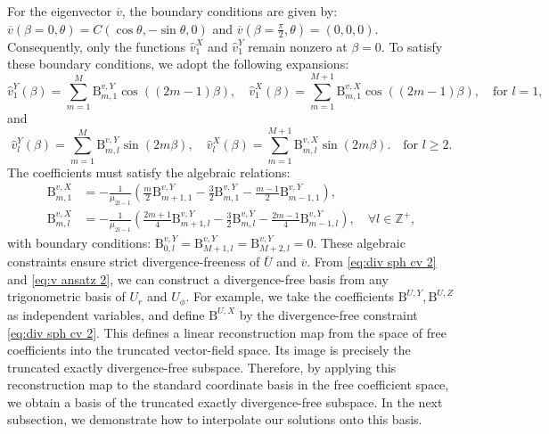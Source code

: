 \documentclass[11pt,a4paper]{article}
\numberwithin{equation}{section}
\newcommand{\Beta}{\mathrm{B}}
\begin{document}
For the eigenvector $\overline{v}$, the boundary conditions are given by: $\overline{v}
(\beta = 0, \theta) = C (\cos \theta, - \sin \theta, 0)$ and $\overline{v} \left(
\beta = \frac{\pi}{2}, \theta \right) = (0, 0, 0)$. Consequently, only the
functions $\widehat{v}_1^X$ and $\widehat{v}_1^Y$ remain nonzero at $\beta = 0$. To
satisfy these boundary conditions, we adopt the following expansions:
\begin{equation*}
  \widehat{v}_1^Y (\beta) = \sum_{m = 1}^M \Beta^{v, Y}_{m, 1} \cos ((2 m - 1)
  \beta), \quad \widehat{v}_1^X (\beta) = \sum_{m = 1}^{M + 1} \Beta^{v, X}_{m, 1}
  \cos ((2 m - 1) \beta), \quad \text{for } l = 1, \label{eq:v ansatz 2.1}
\end{equation*}
and
\begin{equation*}
  \widehat{v}_l^Y (\beta) = \sum_{m = 1}^M \Beta^{v, Y}_{m, l} \sin (2 m \beta),
  \quad \widehat{v}_l^X (\beta) = \sum_{m = 1}^{M + 1} \Beta^{v, X}_{m, l} \sin (2
  m \beta) . \quad \text{for $l \geqslant 2$.} \label{eq:v1 ansatz 2}
\end{equation*}
The coefficients must satisfy the algebraic relations:
\begin{equation}
\begin{aligned}
  \Beta^{v, X}_{m, 1} & = - \frac{1}{\mu_{2 l - 1}}  \left( \frac{m}{2}
  \Beta^{v, Y}_{m + 1, 1} - \frac{3}{2} \Beta^{v, Y}_{m, 1} - \frac{m - 1}{2}
  \Beta^{v, Y}_{m - 1, 1} \right),\\
  \Beta^{v, X}_{m, l} & = - \frac{1}{\mu_{2 l - 1}}  \left( \frac{2 m + 1}{4}
  \Beta^{v, Y}_{m + 1, l} - \frac{3}{2} \Beta^{v, Y}_{m, l} - \frac{2 m -
  1}{4} \Beta^{v, Y}_{m - 1, l} \right), \quad \forall l \in \mathbb{Z}^+,
\end{aligned}\label{eq:v ansatz 2}\end{equation}
with boundary conditions: $\Beta^{v, Y}_{0, l} = \Beta^{v, Y}_{M + 1, l} =
\Beta^{v, Y}_{M + 2, l} = 0$. These algebraic constraints ensure strict divergence-freeness of $\overline{U}$ and
$\overline{v}$. From \eqref{eq:div sph cv 2} and \eqref{eq:v ansatz 2}, we can construct a divergence-free basis from any trigonometric basis of $U_r$ and $U_\phi$. For example, we take the coefficients 
$\Beta^{U, Y}, \Beta^{U, Z}$
as independent variables, and define 
$\Beta^{U, X}$
 by the divergence-free constraint \eqref{eq:div sph cv 2}. This defines a linear reconstruction map from the space of free coefficients into the truncated vector-field space. Its image is precisely the truncated exactly divergence-free subspace. Therefore, by applying this reconstruction map to the standard coordinate basis in the free coefficient space, we obtain a basis of the truncated exactly divergence-free subspace.
 In the next subsection, we demonstrate how to interpolate our
solutions onto this basis.
\end{document}
